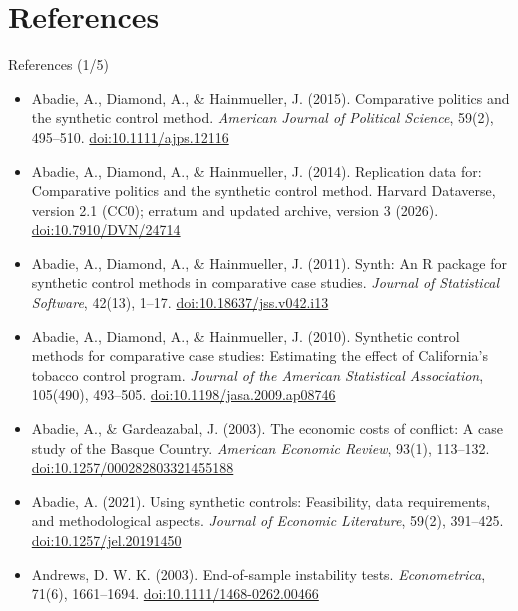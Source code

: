 \section{References}

\begin{frame}{References (1/5)}
\itemsize{\tiny}
\begin{itemize}
    \item Abadie, A., Diamond, A., \& Hainmueller, J. (2015). Comparative politics and the synthetic control method. \textit{American Journal of Political Science}, 59(2), 495--510. \href{https://doi.org/10.1111/ajps.12116}{doi:10.1111/ajps.12116}
    \item Abadie, A., Diamond, A., \& Hainmueller, J. (2014). Replication data for: Comparative politics and the synthetic control method. Harvard Dataverse, version 2.1 (CC0); erratum and updated archive, version 3 (2026). \href{https://doi.org/10.7910/DVN/24714}{doi:10.7910/DVN/24714}
    \item Abadie, A., Diamond, A., \& Hainmueller, J. (2011). Synth: An R package for synthetic control methods in comparative case studies. \textit{Journal of Statistical Software}, 42(13), 1--17. \href{https://doi.org/10.18637/jss.v042.i13}{doi:10.18637/jss.v042.i13}
    \item Abadie, A., Diamond, A., \& Hainmueller, J. (2010). Synthetic control methods for comparative case studies: Estimating the effect of California’s tobacco control program. \textit{Journal of the American Statistical Association}, 105(490), 493--505. \href{https://doi.org/10.1198/jasa.2009.ap08746}{doi:10.1198/jasa.2009.ap08746}
    \item Abadie, A., \& Gardeazabal, J. (2003). The economic costs of conflict: A case study of the Basque Country. \textit{American Economic Review}, 93(1), 113--132. \href{https://doi.org/10.1257/000282803321455188}{doi:10.1257/000282803321455188}
    \item Abadie, A. (2021). Using synthetic controls: Feasibility, data requirements, and methodological aspects. \textit{Journal of Economic Literature}, 59(2), 391--425. \href{https://doi.org/10.1257/jel.20191450}{doi:10.1257/jel.20191450}
    \item Andrews, D. W. K. (2003). End-of-sample instability tests. \textit{Econometrica}, 71(6), 1661--1694. \href{https://doi.org/10.1111/1468-0262.00466}{doi:10.1111/1468-0262.00466}

\end{itemize}
\end{frame}
